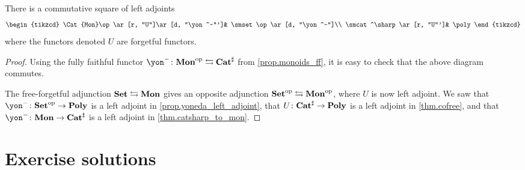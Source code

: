 \documentclass[Book-Poly]{subfiles}
\begin{document}
\begin{proposition}\label{prop.traj_mon_poly}
There is a commutative square of left adjoints
\[
\begin{tikzcd}
	\Cat{Mon}\op\ar[r, "U"]\ar[d, "\yon^-"']&
	\smset\op\ar[d, "\yon^-"]\\
	\smcat^\sharp\ar[r, "U"']&
	\poly
\end{tikzcd}
\]
where the functors denoted $U$ are forgetful functors.
\end{proposition}
\begin{proof}
Using the fully faithful functor $\yon^-\colon\Cat{Mon}\op\fromto\smcat^\sharp$ from \cref{prop.monoids_ff}, it is easy to check that the above diagram commutes. 

The free-forgetful adjunction $\mathbf{Set}\leftrightarrows\mathbf{Mon}$ gives an opposite adjunction $\mathbf{Set}^{\textnormal{op}}\leftrightarrows\mathbf{Mon}^{\textnormal{op}}$, where $U$ is now left adjoint. We saw that $\yon^-\colon\smset\op\to\poly$ is a left adjoint in \cref{prop.yoneda_left_adjoint}, that $U\colon\mathbf{Cat}^\sharp\to\mathbf{Poly}$ is a left adjoint in \cref{thm.cofree}, and that $\yon^-\colon\Cat{Mon}\to\smcat^\sharp$ is a left adjoint in \cref{thm.catsharp_to_mon}.
\end{proof}

\section{Exercise solutions}
{\footnotesize
}
\end{document}
